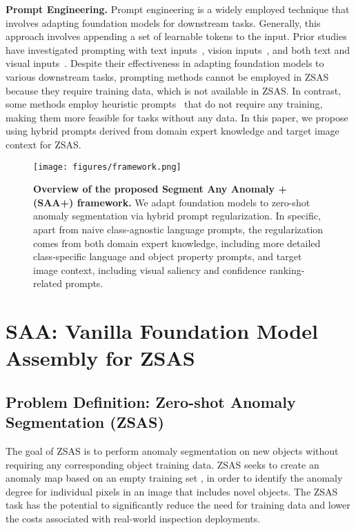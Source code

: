 \documentclass{article}
\begin{document}
\noindent\textbf{Prompt Engineering. } 
Prompt engineering is a widely employed technique that involves adapting foundation models for downstream tasks. Generally, this approach involves appending a set of learnable tokens to the input.  Prior studies have investigated prompting with text inputs~\cite{zhou_conditional}, vision inputs~\cite{ju_prompting_2022, jia_visual_2022, bahng_exploring_2022}, and both text and visual inputs~\cite{zang_unified_2022, shen_multitask_2022, zhou_learning_2022}. Despite their effectiveness in adapting foundation models to various downstream tasks, prompting methods cannot be employed in ZSAS because they require training data, which is not available in ZSAS. In contrast, some methods employ heuristic prompts~\cite{shtedritski_what_2023} that do not require any training, making them more feasible for tasks without any data. In this paper, we propose using hybrid prompts derived from domain expert knowledge and target image context for ZSAS. 

\begin{figure*}[!t]
  \centering
  \texttt{[image: figures/framework.png]}
  \vspace{-0.15in}
  \caption{\textbf{Overview of the proposed Segment Any Anomaly + (SAA+) framework.} We adapt foundation models to zero-shot anomaly segmentation via hybrid prompt regularization. In specific, apart from naive class-agnostic language prompts, the regularization comes from both domain expert knowledge, including more detailed class-specific language and object property prompts, and target image context, including visual saliency and confidence ranking-related prompts.
  }  
  \label{fig:framework}
  
\end{figure*}


\section{SAA: Vanilla Foundation Model Assembly for ZSAS}

\subsection{Problem Definition: Zero-shot Anomaly Segmentation (ZSAS)}

The goal of ZSAS is to perform anomaly segmentation on new objects without requiring any corresponding object training data. ZSAS seeks to create an anomaly map  based on an empty training set , in order to identify the anomaly degree for individual pixels in an image  that includes novel objects. The ZSAS task has the potential to significantly reduce the need for training data and lower the costs associated with real-world inspection deployments.
\end{document}
